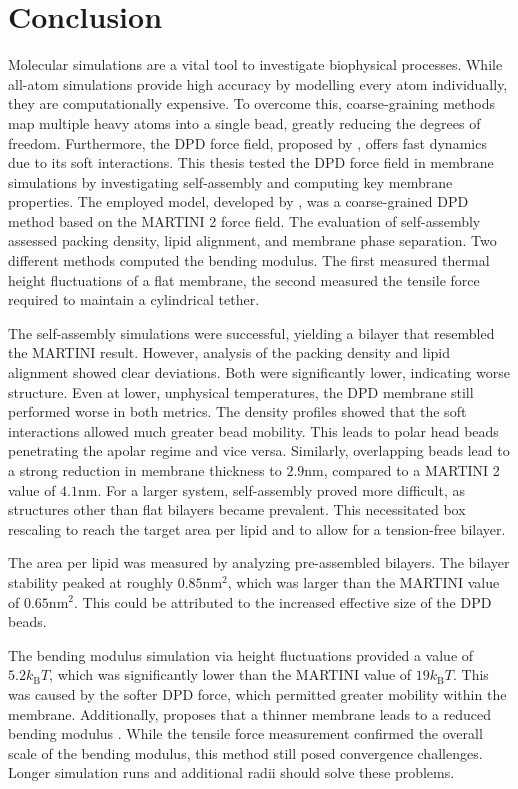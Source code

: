 \documentclass[
    11pt,
    a4paper,
    oneside,        %
    BCOR=10mm,      %
    parskip=half,   %
    listof=nototoc,   %
    bibliography=totoc %
]{scrreprt}
\begin{document}
\chapter{Conclusion} \label{ch.conclusion}

Molecular simulations are a vital tool to investigate biophysical processes. While all-atom simulations provide high accuracy by modelling every atom individually, they are computationally expensive. To overcome this, coarse-graining methods map multiple heavy atoms into a single bead, greatly reducing the degrees of freedom. Furthermore, the DPD force field, proposed by \citeauthor{DPD_groot_warren} \cite{DPD_groot_warren}, offers fast dynamics due to its soft interactions. This thesis tested the DPD force field in membrane simulations by investigating self-assembly and computing key membrane properties. The employed model, developed by \citeauthor{Wang2024} \cite{Wang2024}, was a coarse-grained DPD method based on the MARTINI 2 force field. The evaluation of self-assembly assessed packing density, lipid alignment, and membrane phase separation. Two different methods computed the bending modulus. The first measured thermal height fluctuations of a flat membrane, the second measured the tensile force required to maintain a cylindrical tether.

The self-assembly simulations were successful, yielding a bilayer that resembled the MARTINI result. However, analysis of the packing density and lipid alignment showed clear deviations. Both were significantly lower, indicating worse structure. Even at lower, unphysical temperatures, the DPD membrane still performed worse in both metrics. The density profiles showed that the soft interactions allowed much greater bead mobility. This leads to polar head beads penetrating the apolar regime and vice versa. Similarly, overlapping beads lead to a strong reduction in membrane thickness to $2.9\si{\nano\m}$, compared to a MARTINI 2 value of $4.1\si{\nano\m}$. For a larger system, self-assembly proved more difficult, as structures other than flat bilayers became prevalent. This necessitated box rescaling to reach the target area per lipid and to allow for a tension-free bilayer. 

The area per lipid was measured by analyzing pre-assembled bilayers. The bilayer stability peaked at roughly $0.85\si{\nano\m\squared}$, which was larger than the MARTINI value of $0.65\si{\nano\m\squared}$. This could be attributed to the increased effective size of the DPD beads.

The bending modulus simulation via height fluctuations provided a value of $5.2k_\text{B}T$, which was significantly lower than the MARTINI value of $19k_\text{B}T$. This was caused by the softer DPD force, which permitted greater mobility within the membrane. Additionally, \citeauthor{bending_thickness} proposes that a thinner membrane leads to a reduced bending modulus \cite{bending_thickness}. While the tensile force measurement confirmed the overall scale of the bending modulus, this method still posed convergence challenges. Longer simulation runs and additional radii should solve these problems.  
\end{document}
